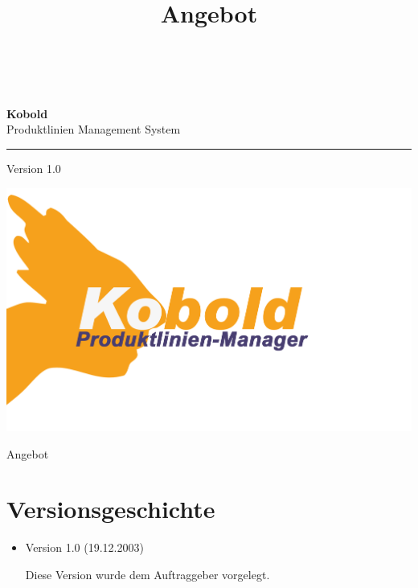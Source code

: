 \documentclass[a4paper,titlepage,12pt,ngerman]{scrbook}
\title {\huge \product\\[0.5cm]\large Angebot\\[0.5cm] \version
  \\[1cm] \Large \company}
\newcommand\version{Version 1.0\xspace}
\begin{document}

\begin{titlepage}
\renewcommand{\thefootnote}{\fnsymbol{footnote}}
{\Huge
\raggedright
\textbf{\bf Kobold} \\
\huge Produktlinien Management System
\rule{\textwidth}{0.75pt}
\par
}
\begin{flushleft}
\normalsize
\version
\end{flushleft}

\vspace*{3cm}
\begin{center}
\includegraphics[width=15cm]{../common/logo-color.png}
\end{center}
\vfill

{\parindent=0cm
\Huge Angebot
}


\setcounter{footnote}{0}
\end{titlepage}


\section*{Versionsgeschichte}

\begin{itemize}

\item Version 1.0 (19.12.2003)

  Diese Version wurde dem Auftraggeber vorgelegt.

\end{itemize}
\end{document}
